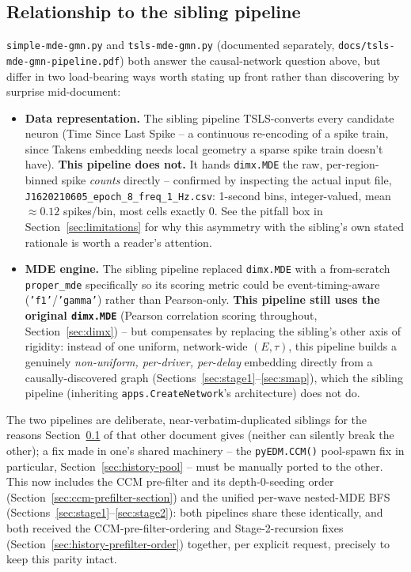 \documentclass[11pt]{article}
\begin{document}
\subsection{Relationship to the sibling pipeline}
\label{sec:sibling}
\texttt{simple-mde-gmn.py} and \texttt{tsls-mde-gmn.py} (documented separately, \texttt{docs/tsls-mde-gmn-pipeline.pdf}) both answer the causal-network question above, but differ in two load-bearing ways worth stating up front rather than discovering by surprise mid-document:
\begin{itemize}
  \item \textbf{Data representation.} The sibling pipeline TSLS-converts every candidate neuron (Time Since Last Spike -- a continuous re-encoding of a spike train, since Takens embedding needs local geometry a sparse spike train doesn't have). \textbf{This pipeline does not.} It hands \texttt{dimx.MDE} the raw, per-region-binned spike \emph{counts} directly -- confirmed by inspecting the actual input file, \texttt{J1620210605\_epoch\_8\_freq\_1\_Hz.csv}: 1-second bins, integer-valued, mean $\approx 0.12$ spikes/bin, most cells exactly 0. See the pitfall box in Section~\ref{sec:limitations} for why this asymmetry with the sibling's own stated rationale is worth a reader's attention.
  \item \textbf{MDE engine.} The sibling pipeline replaced \texttt{dimx.MDE} with a from-scratch \texttt{proper_mde} specifically so its scoring metric could be event-timing-aware (\texttt{'f1'}/\texttt{'gamma'}) rather than Pearson-only. \textbf{This pipeline still uses the original \texttt{dimx.MDE}} (Pearson correlation scoring throughout, Section~\ref{sec:dimx}) -- but compensates by replacing the sibling's other axis of rigidity: instead of one uniform, network-wide $(E,\tau)$, this pipeline builds a genuinely \emph{non-uniform, per-driver, per-delay} embedding directly from a causally-discovered graph (Sections~\ref{sec:stage1}--\ref{sec:smap}), which the sibling pipeline (inheriting \texttt{apps.CreateNetwork}'s architecture) does not do.
\end{itemize}
The two pipelines are deliberate, near-verbatim-duplicated siblings for the reasons Section~\ref{sec:sibling} of that other document gives (neither can silently break the other); a fix made in one's shared machinery -- the \texttt{pyEDM.CCM()} pool-spawn fix in particular, Section~\ref{sec:history-pool} -- must be manually ported to the other. This now includes the CCM pre-filter and its depth-0-seeding order (Section~\ref{sec:ccm-prefilter-section}) and the unified per-wave nested-MDE BFS (Sections~\ref{sec:stage1}--\ref{sec:stage2}): both pipelines share these identically, and both received the CCM-pre-filter-ordering and Stage-2-recursion fixes (Section~\ref{sec:history-prefilter-order}) together, per explicit request, precisely to keep this parity intact.
\end{document}
